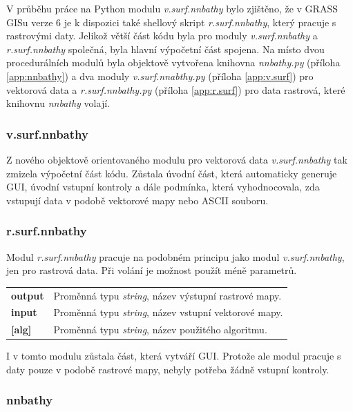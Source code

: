 \documentclass[12pt,a4paper]{article}
\begin{document}
V průběhu práce na Python modulu \emph{v.surf.nnbathy} bylo
zjištěno, že v GRASS GISu verze 6 je k dispozici také shellový skript
\emph{r.surf.nnbathy}, který pracuje s rastrovými daty. Jelikož větší
část kódu byla pro moduly \emph{v.surf.nnbathy} a \emph{r.surf.nnbathy} společná,
byla hlavní výpočetní část spojena. Na místo dvou procedurálních
modulů byla objektově vytvořena knihovna \emph{nnbathy.py} (příloha \ref{app:nnbathy}) a dva
moduly \emph{v.surf.nnabthy.py} (příloha \ref{app:v.surf}) pro vektorová data a
\emph{r.surf.nnbathy.py} (příloha \ref{app:r.surf}) pro data rastrová, které knihovnu
\emph{nnbathy} volají.

\subsubsection{v.surf.nnbathy}
Z nového objektově orientovaného modulu pro vektorová data \emph{v.surf.nnbathy} tak zmizela výpočetní část kódu. Zůstala úvodní část, která automaticky generuje GUI,
úvodní vstupní kontroly a dále podmínka, která vyhodnocovala, zda vstupují data v podobě
vektorové mapy nebo ASCII souboru.

\subsubsection{r.surf.nnbathy}
\label{subsub:r.surf.nnbathy}

Modul \emph{r.surf.nnbathy} pracuje na podobném principu jako modul
\emph{v.surf.nnbathy}, jen pro rastrová data. Při volání je možnost
použít méně parametrů.

\begin{tabular}{ll}
\textbf{output}& Proměnná typu \emph{string}, název výstupní rastrové mapy.\\
\textbf{input}& Proměnná typu \emph{string}, název vstupní vektorové mapy.\\
\textbf{[alg]}& Proměnná typu \emph{string}, název použitého algoritmu.\\
\end{tabular}

I v tomto modulu zůstala část, která vytváří GUI. Protože ale modul
pracuje s daty pouze v podobě rastrové mapy, nebyly potřeba žádně
vstupní kontroly.

\newpage
\subsubsection{nnbathy}
\end{document}
